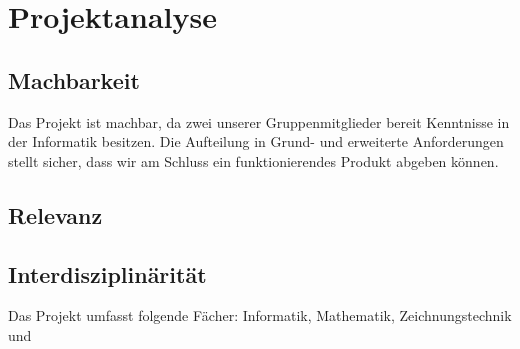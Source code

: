 \section{Projektanalyse}

\subsection{Machbarkeit}
Das Projekt ist machbar, da zwei unserer Gruppenmitglieder bereit Kenntnisse in der Informatik besitzen. Die Aufteilung in Grund- und erweiterte Anforderungen stellt sicher, dass wir am Schluss ein funktionierendes Produkt abgeben können.
\subsection{Relevanz}
\subsection{Interdisziplinärität}
Das Projekt umfasst folgende Fächer: Informatik, Mathematik, Zeichnungstechnik und 

